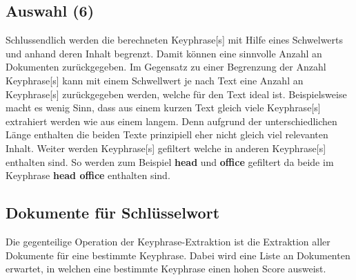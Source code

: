 
\subsection{Auswahl (6)}


Schlussendlich werden die berechneten \gls{Keyphrase}[s] mit Hilfe eines Schw\-el\-werts und anhand deren Inhalt begrenzt. Damit können eine sinnvolle Anzahl an Dokumenten zurückgegeben. Im Gegensatz zu einer Begrenzung der Anzahl \gls{Keyphrase}[s] kann mit einem Schwellwert je nach Text eine Anzahl an \gls{Keyphrase}[s] zurückgegeben werden, welche für den Text ideal ist. Beispielsweise macht es wenig Sinn, dass aus einem kurzen Text gleich viele \gls{Keyphrase}[s] extrahiert werden wie aus einem langem. Denn aufgrund der unterschiedlichen Länge enthalten die beiden Texte prinzipiell eher nicht gleich viel relevanten Inhalt. Weiter werden \gls{Keyphrase}[s] gefiltert welche in anderen \gls{Keyphrase}[s] enthalten sind. So werden zum Beispiel \textbf{head} und \textbf{office} gefiltert da beide im \gls{Keyphrase} \textbf{head office} enthalten sind.



\subsection{Dokumente für Schlüsselwort}


Die gegenteilige Operation der \gls{Keyphrase}-Extraktion ist die Extraktion aller Dokumente für eine bestimmte \gls{Keyphrase}. Dabei wird eine Liste an Dokumenten erwartet, in welchen eine bestimmte \gls{Keyphrase} einen hohen \gls{Score} ausweist. 

